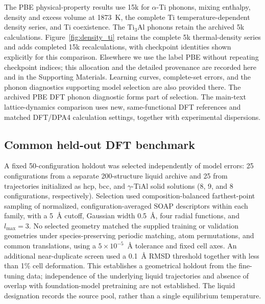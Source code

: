 The PBE physical-property results use 15k for $\alpha$-Ti phonons, mixing enthalpy, density and excess volume at 1873~K, the complete Ti temperature-dependent density series, and Ti coexistence.
The Ti$_3$Al phonons retain the archived 5k calculations. Figure~\ref{fig:density_ti} retains the complete 5k thermal-density series and adds completed 15k recalculations, with checkpoint identities shown explicitly for this comparison.
Elsewhere we use the label PBE without repeating checkpoint indices; this allocation and the detailed provenance are recorded here and in the Supporting Materials.
Learning curves, complete-set errors, and the phonon diagnostics supporting model selection are also provided there.
The archived PBE DFT phonon diagnostic forms part of selection. The main-text lattice-dynamics comparison uses new, same-functional DFT references and matched DFT/DPA4 calculation settings, together with experimental dispersions.

\subsection{Common held-out DFT benchmark}
\label{sec:testset}

A fixed 50-configuration holdout was selected independently of model errors: 25 configurations from a separate 200-structure liquid archive and 25 from trajectories initialized as hcp, bcc, and $\gamma$-TiAl solid solutions (8, 9, and 8 configurations, respectively).
Selection used composition-balanced farthest-point sampling of normalized, configuration-averaged SOAP descriptors within each family, with a 5~\AA{} cutoff, Gaussian width 0.5~\AA, four radial functions, and $l_{\max}=3$.
No selected geometry matched the supplied training or validation geometries under species-preserving periodic matching, atom permutations, and common translations, using a $5\times10^{-5}$~\AA{} tolerance and fixed cell axes.
An additional near-duplicate screen used a 0.1~\AA{} RMSD threshold together with less than 1\% cell deformation.
This establishes a geometrical holdout from the fine-tuning data; independence of the underlying liquid trajectories and absence of overlap with foundation-model pretraining are not established.
The liquid designation records the source pool, rather than a single equilibrium temperature.

